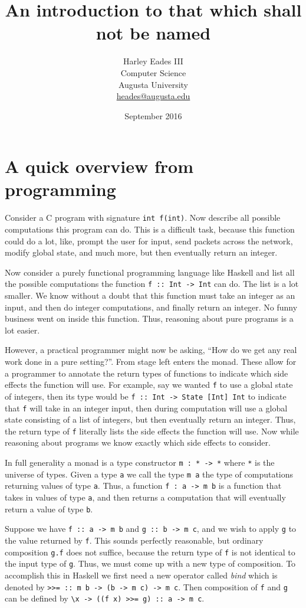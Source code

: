 \documentclass{article}
\title{An introduction to that which shall not be named}
\author{Harley Eades III\\Computer Science\\Augusta University\\\href{mailto:heades@augusta.edu}{heades@augusta.edu}}
\date{September 2016}
\begin{document}
\maketitle

\section{A quick overview from programming}
\label{sec:a_quick_example_from_programming}
Consider a C program with signature \verb!int f(int)!.  Now describe
all possible computations this program can do.  This is a difficult
task, because this function could do a lot, like, prompt the user for
input, send packets across the network, modify global state, and much
more, but then eventually return an integer.

Now consider a purely functional programming language like Haskell
\cite{Haskell} and list all the possible computations the function
\verb!f :: Int -> Int! can do. The list is a lot smaller.  We know
without a doubt that this function must take an integer as an input,
and then do integer computations, and finally return an integer.  No
funny business went on inside this function.  Thus, reasoning about
pure programs is a lot easier.

However, a practical programmer might now be asking, ``How do we get
any real work done in a pure setting?''.  From stage left enters the
monad.  These allow for a programmer to annotate the return types of
functions to indicate which side effects the function will use.  For
example, say we wanted \verb!f! to use a global state of integers,
then its type would be \verb!f :: Int -> State [Int] Int! to indicate
that \verb!f! will take in an integer input, then during computation
will use a global state consisting of a list of integers, but then
eventually return an integer.  Thus, the return type of \verb!f!
  literally lists the side effects the function will use.  Now while
  reasoning about programs we know exactly which side effects to
  consider.

In full generality a monad is a type constructor \verb!m : * -> *!
where \verb!*! is the universe of types.  Given a type \verb!a! we
call the type \verb!m a! the type of computations returning values
of type \verb!a!.  Thus, a function \verb!f : a -> m b! is a function that
takes in values of type \verb!a!, and then returns a computation that
will eventually return a value of type \verb!b!.

Suppose we have \verb!f :: a -> m b! and \verb!g :: b -> m c!, and we
wish to apply \verb!g! to the value returned by \verb!f!. This sounds
perfectly reasonable, but ordinary composition \verb!g.f! does not
suffice, because the return type of \verb!f! is not identical to the
input type of \verb!g!.  Thus, we must come up with a new type of
composition.  To accomplish this in Haskell we first need a new
operator called \textit{bind} which is denoted by
\verb!>>= :: m b -> (b -> m c) -> m c!.  Then composition of \verb!f!
and \verb!g! can be defined by
\verb!\x -> ((f x) >>= g) :: a -> m c!.
\end{document}
